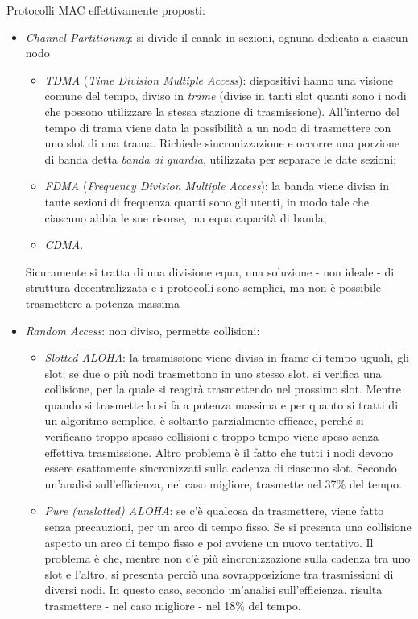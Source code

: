 Protocolli MAC effettivamente proposti:
\begin{itemize}
	\item \textit{Channel Partitioning}: si divide il canale in sezioni, ognuna dedicata a ciascun nodo
	\begin{itemize}
		\item \textit{TDMA} (\textit{Time Division Multiple Access}): dispositivi hanno una visione comune del tempo, diviso in \textit{trame} (divise in tanti slot quanti sono i nodi che possono utilizzare la stessa stazione di trasmissione). All'interno del tempo di trama viene data la possibilità a un nodo di trasmettere con uno slot di una trama. Richiede sincronizzazione e occorre una porzione di banda detta \textit{banda di guardia}, utilizzata per separare le date sezioni;
		\item \textit{FDMA} (\textit{Frequency Division Multiple Access}): la banda viene divisa in tante sezioni di frequenza quanti sono gli utenti, in modo tale che ciascuno abbia le sue risorse, ma equa capacità di banda;
		\item \textit{CDMA}.
	\end{itemize}
	Sicuramente si tratta di una divisione equa, una soluzione - non ideale - di struttura decentralizzata e i protocolli sono semplici, ma non è possibile trasmettere a potenza massima 
	\item \textit{Random Access}: non diviso, permette collisioni:
	\begin{itemize}
		\item \textit{Slotted ALOHA}: la trasmissione viene divisa in frame di tempo uguali, gli slot; se due o più nodi trasmettono in uno stesso slot, si verifica una collisione, per la quale si reagirà trasmettendo nel prossimo slot. Mentre quando si trasmette lo si fa a potenza massima e per quanto si tratti di un algoritmo semplice, è soltanto parzialmente efficace, perché si verificano troppo spesso collisioni e troppo tempo viene speso senza effettiva trasmissione. Altro problema è il fatto che tutti i nodi devono essere esattamente sincronizzati sulla cadenza di ciascuno slot. Secondo un'analisi sull'efficienza, nel caso migliore, trasmette nel 37\% del tempo.
		\item \textit{Pure (unslotted) ALOHA}: se c'è qualcosa da trasmettere, viene fatto senza precauzioni, per un arco di tempo fisso. Se si presenta una collisione aspetto un arco di tempo fisso e poi avviene un nuovo tentativo. Il problema è che, mentre non c'è più sincronizzazione sulla cadenza tra uno slot e l'altro, si presenta perciò una sovrapposizione tra trasmissioni di diversi nodi. In questo caso, secondo un'analisi sull'efficienza, risulta trasmettere - nel caso migliore - nel 18\% del tempo.

\end{itemize}
\end{itemize}

